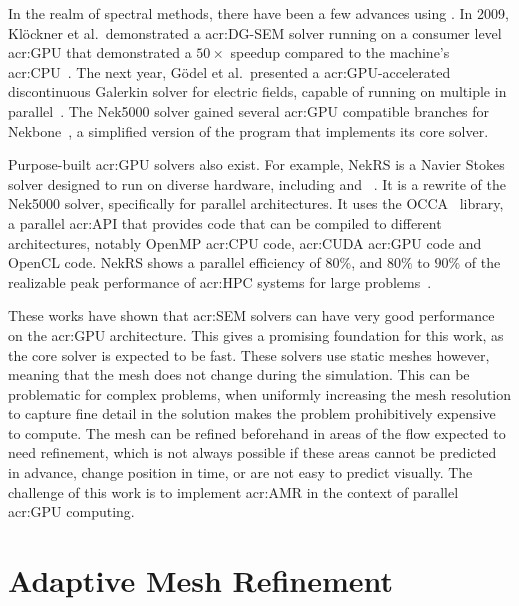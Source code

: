 In the realm of spectral methods, there have been a few advances using . In
2009, Klöckner et al.\ demonstrated a \acrshort{acr:DG-SEM} solver running on a consumer level
\acrshort{acr:GPU} that demonstrated a \(50 \times \) speedup compared to the machine's
\acrshort{acr:CPU}~\cite{Klockner2009}. The next year, Gödel et al.\ presented a
\acrshort{acr:GPU}-accelerated discontinuous Galerkin solver for electric fields, capable of running
on multiple  in parallel~\cite{Godel2010}. The Nek5000 solver gained several
\acrshort{acr:GPU} compatible branches for Nekbone~\cite{Gong2016}\cite{Chalmers2022}, a simplified
version of the program that implements its core solver.

Purpose-built \acrshort{acr:GPU} solvers also exist. For example,  NekRS is a Navier Stokes solver
designed to run on diverse hardware, including  and
~\cite{Fischer2021}. It is a rewrite of the Nek5000 solver, specifically for
parallel architectures. It uses the OCCA~\cite{Medina2014} library, a parallel \acrshort{acr:API}
that provides code that can be compiled to different architectures, notably OpenMP
\acrshort{acr:CPU} code, \acrshort{acr:CUDA} \acrshort{acr:GPU} code and OpenCL code. NekRS shows a
parallel efficiency of \(80 \% \), and \(80 \% \) to \(90 \% \) of the realizable peak performance
of \acrshort{acr:HPC} systems for large problems~\cite{Fischer2021}.

These works have shown that \acrshort{acr:SEM} solvers can have very good performance on the
\acrshort{acr:GPU} architecture. This gives a promising foundation for this work, as the core solver
is expected to be fast. These solvers use static meshes however, meaning that the mesh does not
change during the simulation. This can be problematic for complex problems, when uniformly
increasing the mesh resolution to capture fine detail in the solution makes the problem
prohibitively expensive to compute. The mesh can be refined beforehand in areas of the flow expected
to need refinement, which is not always possible if these areas cannot be predicted in advance,
change position in time, or are not easy to predict visually. The challenge of this work is to
implement \acrlong{acr:AMR} in the context of parallel \acrshort{acr:GPU} computing.

\section{Adaptive Mesh Refinement}\label{section:literature_review:amr}

